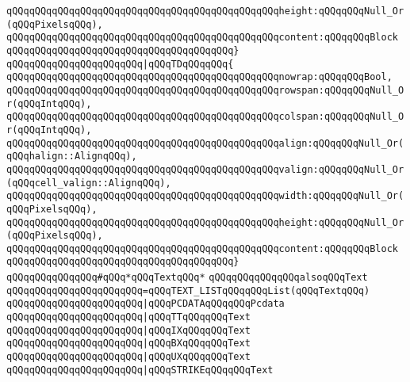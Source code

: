\verb|qQQqqQQqqQQqqQQqqQQqqQQqqQQqqQQqqQQqqQQqqQQqqQQqheight:qQQqqQQqNull_Or(qQQqPixelsqQQq),|\newline
\verb|qQQqqQQqqQQqqQQqqQQqqQQqqQQqqQQqqQQqqQQqqQQqqQQqcontent:qQQqqQQqBlock|\newline
\verb|qQQqqQQqqQQqqQQqqQQqqQQqqQQqqQQqqQQqqQQq}|\newline
\verb|qQQqqQQqqQQqqQQqqQQqqQQq|\verb#|qQQqTDqQQqqQQq{#\newline
\verb|qQQqqQQqqQQqqQQqqQQqqQQqqQQqqQQqqQQqqQQqqQQqqQQqnowrap:qQQqqQQqBool,|\newline
\verb|qQQqqQQqqQQqqQQqqQQqqQQqqQQqqQQqqQQqqQQqqQQqqQQqrowspan:qQQqqQQqNull_Or(qQQqIntqQQq),|\newline
\verb|qQQqqQQqqQQqqQQqqQQqqQQqqQQqqQQqqQQqqQQqqQQqqQQqcolspan:qQQqqQQqNull_Or(qQQqIntqQQq),|\newline
\verb|qQQqqQQqqQQqqQQqqQQqqQQqqQQqqQQqqQQqqQQqqQQqqQQqalign:qQQqqQQqNull_Or(qQQqhalign::AlignqQQq),|\newline
\verb|qQQqqQQqqQQqqQQqqQQqqQQqqQQqqQQqqQQqqQQqqQQqqQQqvalign:qQQqqQQqNull_Or(qQQqcell_valign::AlignqQQq),|\newline
\verb|qQQqqQQqqQQqqQQqqQQqqQQqqQQqqQQqqQQqqQQqqQQqqQQqwidth:qQQqqQQqNull_Or(qQQqPixelsqQQq),|\newline
\verb|qQQqqQQqqQQqqQQqqQQqqQQqqQQqqQQqqQQqqQQqqQQqqQQqheight:qQQqqQQqNull_Or(qQQqPixelsqQQq),|\newline
\verb|qQQqqQQqqQQqqQQqqQQqqQQqqQQqqQQqqQQqqQQqqQQqqQQqcontent:qQQqqQQqBlock|\newline
\verb|qQQqqQQqqQQqqQQqqQQqqQQqqQQqqQQqqQQqqQQq}|\newline
\newline
\verb|qQQqqQQqqQQqqQQq#qQQq*qQQqTextqQQq*|\newline
\verb|qQQqqQQqqQQqqQQqalsoqQQqText|\newline
\verb|qQQqqQQqqQQqqQQqqQQqqQQq=qQQqTEXT_LISTqQQqqQQqList(qQQqTextqQQq)|\newline
\verb|qQQqqQQqqQQqqQQqqQQqqQQq|\verb#|qQQqPCDATAqQQqqQQqPcdata#\newline
\verb|qQQqqQQqqQQqqQQqqQQqqQQq|\verb#|qQQqTTqQQqqQQqText#\newline
\verb|qQQqqQQqqQQqqQQqqQQqqQQq|\verb#|qQQqIXqQQqqQQqText#\newline
\verb|qQQqqQQqqQQqqQQqqQQqqQQq|\verb#|qQQqBXqQQqqQQqText#\newline
\verb|qQQqqQQqqQQqqQQqqQQqqQQq|\verb#|qQQqUXqQQqqQQqText#\newline
\verb|qQQqqQQqqQQqqQQqqQQqqQQq|\verb#|qQQqSTRIKEqQQqqQQqText#\newline
